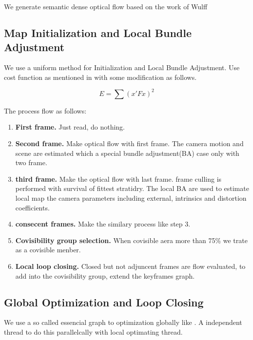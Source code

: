 \documentclass{article}
\begin{document}
We generate semantic dense optical flow based on the work of Wulff \cite{Wulff2017Optical}

\subsection{Map Initialization and Local Bundle Adjustment}

We use a uniform method for Initialization and Local Bundle Adjustment. Use cost function as mentioned in \cite{Delaunoy2014Photometric} with some modification as follows.

$$E=\sum (x'Fx)^2$$

The process flow as follows:

\begin{enumerate}

\item \textbf{First frame.} Just read, do nothing.
\item \textbf{Second frame.} Make optical flow with first frame. The camera motion and scene are estimated which a special bundle adjustment(BA) case only with two frame.
\item \textbf{third frame.} Make the optical flow with last frame. frame culling is performed with survival of fittest stratidry. The local BA are used to estimate local map the camera parameters including external, intrinsics and distortion coefficients.

\item \textbf{consecent frames.} Make the similary process like step 3.
\item \textbf{Covisibility group selection.} When covisible aera more than 75\% we trate as a covisible menber.

\item \textbf{Local loop closing.} Closed but not adjuncent frames are flow evaluated, to add into the covisibility group, extend the keyframes graph.


\end{enumerate}

\subsection{Global Optimization and Loop Closing}

We use a so called essencial graph to optimization globally like \cite{Mur2017ORB}. A independent thread to do this parallelcally with local optimating thread.\par
\end{document}
